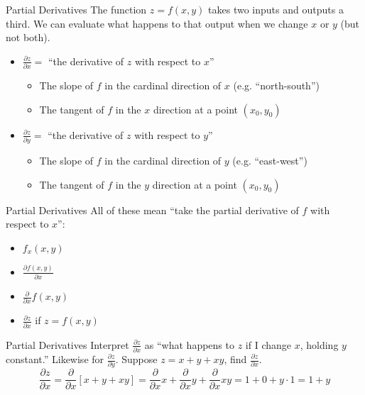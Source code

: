 \documentclass[aspectratio=169]{beamer}
\begin{document}
\begin{frame}{Partial Derivatives}\label{main1}
    The function $z = f(x, y)$ takes two inputs and outputs a third.  We can evaluate what happens to that output when we change $x$ or $y$ (but not both).
    \begin{itemize}
        \item $\frac{\partial z}{\partial x} =$ “the derivative of $z$ with respect to $x$”
        \begin{itemize}
        \item The slope of $f$ in the cardinal direction of $x$ (e.g. “north-south”)
        \item The tangent of $f$ in the $x$ direction at a point $(x_0, y_0)$
        \end{itemize}
        \item $\frac{\partial z}{\partial y} =$ “the derivative of $z$ with respect to $y$”
        \begin{itemize}
        \item The slope of $f$ in the cardinal direction of $y$ (e.g. “east-west”)
        \item The tangent of $f$ in the $y$ direction at a point $(x_0, y_0)$
    	\end{itemize}
    \end{itemize}
\end{frame}

\begin{frame}{Partial Derivatives}\label{main1}
    All of these mean “take the partial derivative of $f$ with respect to $x$”:
    \begin{itemize}
        \item $f_x(x, y)$
        \item $\frac{\partial f(x, y)}{\partial x}$
        \item $\frac{\partial}{\partial x} f(x, y)$
        \item $\frac{\partial z}{\partial x}$ if $z = f(x, y)$
    \end{itemize}
\end{frame}

\begin{frame}{Partial Derivatives}\label{main1}
    Interpret $\frac{\partial z}{\partial x}$ as “what happens to $z$ if I change $x$, holding $y$ constant.” Likewise for $\frac{\partial z}{\partial y}$.
 	Suppose $z = x + y + xy$, find $\frac{\partial z}{\partial x}$.
    \[
    \frac{\partial z}{\partial x} = \frac{\partial}{\partial x} [x + y + xy] = \frac{\partial}{\partial x} x + \frac{\partial}{\partial x} y + \frac{\partial}{\partial x} xy = 1 + 0 + y \cdot 1 = 1 + y
    \]
\end{frame}
\end{document}
